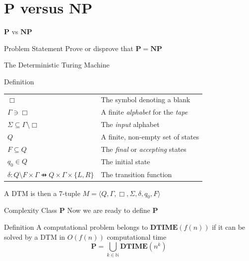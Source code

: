 \documentclass{beamer}
\newcommand{\Natural}{\mathbb{N}}
\newcommand{\PTIME}{\mathbf{P}}
\newcommand{\NPTIME}{\mathbf{NP}}
\newcommand{\DTIME}{\mathbf{DTIME}}
\begin{document}
  \section{$\PTIME$ versus $\NPTIME$}
  \begin{frame}{$\PTIME$ vs $\NPTIME$}
      \begin{block}{Problem Statement}
          Prove or disprove that $\PTIME = \NPTIME$
      \end{block}
  \end{frame}
  \begin{frame}{The Deterministic Turing Machine}
      \pause
      \begin{block}{Definition}
          \pause
          \begin{table}[]
              \centering
              \begin{tabular}{ll}
                  $\Box$ & The symbol denoting a blank \pause \\
                  $\Gamma \ni \Box$
                  & A finite \textit{alphabet} for the \textit{tape} \pause \\
                  $\Sigma \subseteq \Gamma \setminus \Box$ 
                  & The \textit{input} alphabet \pause \\
                  $Q$ & A finite, non-empty set of states \pause \\
                  $F \subseteq Q$
                  & The \textit{final} or \textit{accepting} states \pause \\
                  $q_0 \in Q$ & The initial state \pause \\
                  $\delta: Q \setminus F \times \Gamma \pfun Q
                  \times \Gamma \times \{L, R\}$ & The transition function
              \end{tabular}
          \end{table}
          \pause
          A DTM is then a 7-tuple
          $M = \langle Q, \Gamma, \Box, \Sigma, \delta, q_0, F \rangle$
      \end{block}
  \end{frame}
  \begin{frame}{Complexity Class $\PTIME$}
      Now we are ready to define $\PTIME$
      \pause
      \begin{block}{Definition}
          A computational problem belongs to
              $\DTIME\left(f(n)\right)$ if it can be solved by a
              DTM in $O(f(n))$ computational time 
              \pause
          $$\PTIME = \bigcup_{k \in \Natural}
              \DTIME\left(n^k\right)$$
      \end{block}
  \end{frame}
\end{document}
